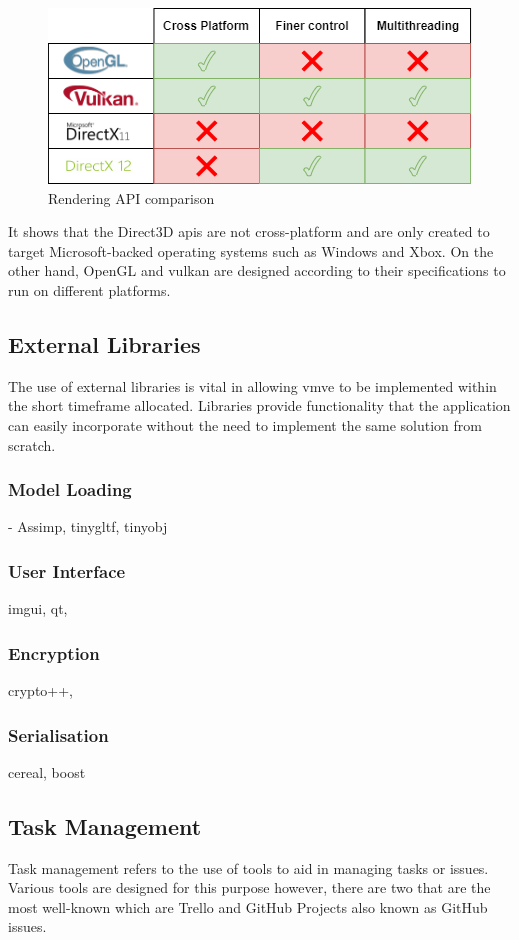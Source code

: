 \documentclass[11pt]{article}
\begin{document}
\begin{figure}[H]
  \centering
  \includegraphics[width=\textwidth]{images/api_comparison.png}
  \caption{Rendering API comparison}
  \label{fig:api_comparison}
\end{figure}

It shows that the Direct3D \glspl*{api} are not cross-platform and are only
created to target Microsoft-backed operating systems such as Windows and Xbox.
On the other hand, OpenGL and \gls*{vulkan} are designed according to their
specifications to run on different platforms.

\subsection{External Libraries}
The use of external libraries is vital in allowing \gls*{vmve} to be implemented
within the short timeframe allocated. Libraries provide functionality that the
application can easily incorporate without the need to implement the same
solution from scratch.

\subsubsection{Model Loading}
- Assimp, tinygltf, tinyobj
\subsubsection{User Interface}
imgui, qt, 
\subsubsection{Encryption}
crypto++, 
\subsubsection{Serialisation}
cereal, boost


\subsection{Task Management}
Task management refers to the use of tools to aid in managing tasks or issues.
Various tools are designed for this purpose however, there are two that are the most
well-known which are Trello and GitHub Projects also known as GitHub issues.
\end{document}
